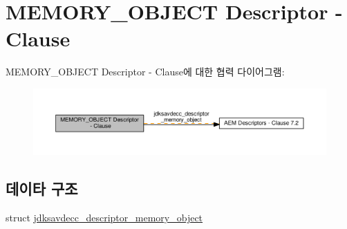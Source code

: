 \hypertarget{group__descriptor__memory__object}{}\section{M\+E\+M\+O\+R\+Y\+\_\+\+O\+B\+J\+E\+CT Descriptor -\/ Clause}
\label{group__descriptor__memory__object}
M\+E\+M\+O\+R\+Y\+\_\+\+O\+B\+J\+E\+CT Descriptor -\/ Clause에 대한 협력 다이어그램\+:
\nopagebreak
\begin{figure}[H]
\begin{center}
\leavevmode
\includegraphics[width=350pt]{group__descriptor__memory__object}
\end{center}
\end{figure}
\subsection*{데이타 구조}
\begin{DoxyCompactItemize}
\item 
struct \hyperlink{structjdksavdecc__descriptor__memory__object}{jdksavdecc\+\_\+descriptor\+\_\+memory\+\_\+object}
\end{DoxyCompactItemize}
